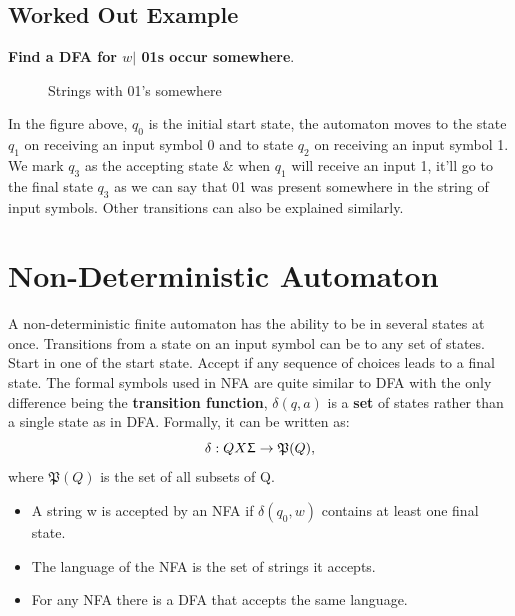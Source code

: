 \documentclass{report}
\begin{document}
\subsection{Worked Out Example}
    \par \textbf{Find a DFA for {$w|$ 01s occur somewhere}}.
    \begin{figure}[ht] 
    \centering 
    \caption{Strings with 01's somewhere}
    \label{fig:my_label}
    \end{figure}
    In the figure above, $q_0$ is the initial start state, the automaton moves to the state $q_1$ on receiving an input symbol 0 and to state $q_2$ on receiving an input symbol 1. We mark $q_3$ as the accepting state \& when $q_1$ will receive an input 1, it'll go to the final state $q_3$ as we can say that 01 was present somewhere in the string of input symbols. Other transitions can also be explained similarly.  


\section{Non-Deterministic Automaton}
A non-deterministic finite automaton has the ability to be in several states at once. Transitions from a state on an input symbol can be to any set of states. Start in one of the start state. Accept if any sequence of choices leads to a final state. The formal symbols used in NFA are quite similar to DFA with the only difference being the \textbf{transition function}, $\delta (q,a)$ is a \textbf{set} of states rather than a single state as in DFA. Formally, it can be written as:
$$\delta: Q X \Upsigma \to \mathfrak{P} (Q),$$ where $\mathfrak{P} (Q)$ is the set of all subsets of Q.
\begin{itemize}
    \item A string w is accepted by an NFA if $\delta (q_0,w)$ contains at least one final state.
    \item The language of the NFA is the set of strings it accepts.
    \item For any NFA there is a DFA that accepts the same language.
\end{itemize}
\end{document}
